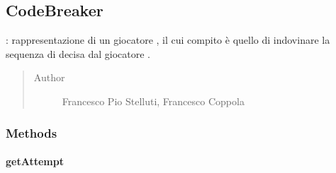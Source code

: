 \documentclass[letterpaper,10pt,italian,openany,oneside]{sphinxmanual}
\begin{document}
\subsection{CodeBreaker}
\label{\detokenize{source/it/unicam/cs/pa/mastermind/players/CodeBreaker:codebreaker}}\label{\detokenize{source/it/unicam/cs/pa/mastermind/players/CodeBreaker::doc}}

\begin{fulllineitems}
\label{\detokenize{source/it/unicam/cs/pa/mastermind/players/CodeBreaker:it.unicam.cs.pa.mastermind.players.CodeBreaker}}
: rappresentazione di un giocatore , il cui compito è quello di indovinare la sequenza di  decisa dal giocatore .
\begin{quote}\begin{description}
\item[{Author}] \leavevmode
Francesco Pio Stelluti, Francesco Coppola

\end{description}\end{quote}

\end{fulllineitems}



\subsubsection{Methods}
\label{\detokenize{source/it/unicam/cs/pa/mastermind/players/CodeBreaker:methods}}

\paragraph{getAttempt}
\label{\detokenize{source/it/unicam/cs/pa/mastermind/players/CodeBreaker:getattempt}}
\end{document}
